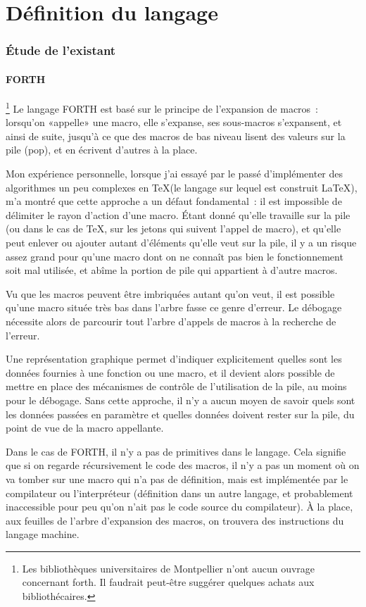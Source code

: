 \documentclass{article}
\begin{document}
\part{Définition du langage}

\section{Étude de l'existant}

\subsection{FORTH}\footnote{Les bibliothèques universitaires de Montpellier n'ont aucun ouvrage concernant forth. Il faudrait peut-être suggérer quelques achats aux bibliothécaires.}
Le langage FORTH est basé sur le principe de l'expansion de macros~: lorsqu'on «appelle» une macro, elle s'expanse, ses sous-macros
s'expansent, et ainsi de suite, jusqu'à ce que des macros de bas niveau lisent des valeurs sur la pile (pop), et en écrivent d'autres à la
place.

Mon expérience personnelle, lorsque j'ai essayé par le passé d'implémenter des algorithmes un peu complexes en \TeX (le langage sur
lequel est construit \LaTeX), m'a montré que cette approche a un défaut fondamental~: il est impossible de délimiter le rayon d'action d'une
macro. Étant donné qu'elle travaille sur la pile (ou dans le cas de \TeX, sur les jetons qui suivent l'appel de macro), et qu'elle peut
enlever ou ajouter autant d'éléments qu'elle veut sur la pile, il y a un risque assez grand pour qu'une macro dont on ne connaît pas bien le
fonctionnement soit mal utilisée, et abîme la portion de pile qui appartient à d'autre macros.

Vu que les macros peuvent être imbriquées autant qu'on veut, il est possible qu'une macro située très bas dans l'arbre fasse ce genre
d'erreur. Le débogage nécessite alors de parcourir tout l'arbre d'appels de macros à la recherche de l'erreur.

Une représentation graphique permet d'indiquer explicitement quelles sont les données fournies à une fonction ou une macro, et il devient
alors possible de mettre en place des mécanismes de contrôle de l'utilisation de la pile, au moins pour le débogage. Sans cette approche, il
n'y a aucun moyen de savoir quels sont les données passées en paramètre et quelles données doivent rester sur la pile, du point de vue de la
macro appellante.

Dans le cas de FORTH, il n'y a pas de primitives dans le langage. Cela signifie que si on regarde récursivement le code des macros, il n'y a
pas un moment où on va tomber sur une macro qui n'a pas de définition, mais est implémentée par le compilateur ou l'interpréteur (définition
dans un autre langage, et probablement inaccessible pour peu qu'on n'ait pas le code source du compilateur). À la place, aux feuilles de
l'arbre d'expansion des macros, on trouvera des instructions du langage machine.
\end{document}
